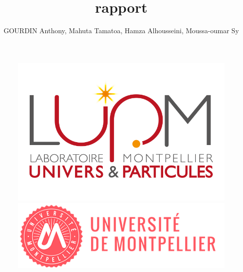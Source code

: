 \documentclass[12pt, a4paper]{report}
\begin{document}
\begin{figure}[ht]
    \begin{minipage}[c]{0\linewidth}
        \centering
        \includegraphics[scale=0.2]{logo_lupm.png}
    \end{minipage}
    \hfill%
    \begin{minipage}[c]{0.36\linewidth}
        \centering
        \includegraphics[scale=0.4]{logo_um.png}
    \end{minipage}
\end{figure}

\title{rapport}
\author{GOURDIN Anthony, Mahuta Tamatoa, Hamza Alhousseini, Moussa-oumar Sy}

\begin{sloppypar}
 \\
\end{sloppypar}
\bigskip
{}
\end{document}
